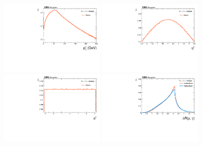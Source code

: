 \begin{figure}[!htbp]
\begin{center}
\includegraphics[width=0.45\textwidth]{figures_and_tables/outputPlots/HtoUpsilon_Cat0_ZZZZZ/mc/unpolarized/h_Gen_Photon_pt}
\includegraphics[width=0.45\textwidth]{figures_and_tables/outputPlots/HtoUpsilon_Cat0_ZZZZZ/mc/unpolarized/h_Gen_Photon_eta}
\includegraphics[width=0.45\textwidth]{figures_and_tables/outputPlots/HtoUpsilon_Cat0_ZZZZZ/mc/unpolarized/h_Gen_Photon_phi}
\includegraphics[width=0.45\textwidth]{figures_and_tables/outputPlots/HtoUpsilon_Cat0_ZZZZZ/mc/unpolarized/h_Gen_deltaR_Mu_Photon}

\end{center}
\end{figure}
